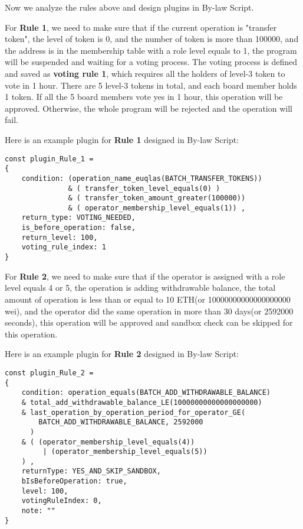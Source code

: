 \documentclass[main.tex]{subfiles}
\begin{document}
Now we analyze the rules above and design plugins in By-law Script.

For \textbf{Rule 1}, we need to make sure that if the current operation is "transfer token", the level of token is 0, and the number of token is more than 100000, and the address is in the membership table with a role level equals to 1, the program will be suspended and waiting for a voting process. The voting process is defined and saved as \textbf{voting rule 1}, which requires all the holders of level-3 token to vote in 1 hour. There are 5 level-3 tokens in total, and each board member holds 1 token. If all the 5 board members vote yes in 1 hour, this operation will be approved. Otherwise, the whole program will be rejected and the operation will fail.

Here is an example plugin for \textbf{Rule 1} designed in By-law Script:

\begin{verbatim}
const plugin_Rule_1 = 
{
    condition: (operation_name_euqlas(BATCH_TRANSFER_TOKENS))
               & ( transfer_token_level_equals(0) )
               & ( transfer_token_amount_greater(100000)) 
               & ( operator_membership_level_equals(1)) ,
    return_type: VOTING_NEEDED,
    is_before_operation: false,
    return_level: 100,
    voting_rule_index: 1
}
\end{verbatim}

For \textbf{Rule 2}, we need to make sure that if the operator is assigned with a role level equals 4 or 5, the operation is adding withdrawable balance, the total amount of operation is less than or equal to 10 ETH(or 10000000000000000000 wei), and the operator did the same operation in more than 30 days(or 2592000 seconds), this operation will be approved and sandbox check can be skipped for this operation.

Here is an example plugin for \textbf{Rule 2} designed in By-law Script:

\begin{verbatim}
const plugin_Rule_2 = 
{
    condition: operation_equals(BATCH_ADD_WITHDRAWABLE_BALANCE)
    & total_add_withdrawable_balance_LE(10000000000000000000)
    & last_operation_by_operation_period_for_operator_GE(
        BATCH_ADD_WITHDRAWABLE_BALANCE, 2592000
      )
    & ( (operator_membership_level_equals(4)) 
         | (operator_membership_level_equals(5)) 
    ) ,
    returnType: YES_AND_SKIP_SANDBOX,
    bIsBeforeOperation: true,
    level: 100,
    votingRuleIndex: 0,
    note: ""
}
\end{verbatim}
\end{document}
